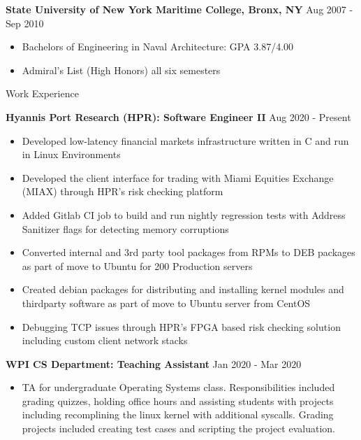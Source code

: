 \documentclass[10pt,a4paper]{article}
\begin{document}
{\begin{tcolorbox}
      \large{\textbf{State University of New York Maritime College, Bronx, NY}}
      \hfill
      \large{Aug 2007 - Sep 2010}
      \begin{itemize}[noitemsep]
        \item Bachelors of Engineering in Naval Architecture: GPA 3.87/4.00
        \item Admiral's List (High Honors) all six semesters 
      \end{itemize}
\end{tcolorbox}

\begin{tcolorbox}

  {\selectfont
    \begin{center}
      \LARGE{Work Experience}
    \end{center}
  }

  \tcblower

  \large{\textbf{Hyannis Port Research (HPR): Software Engineer II}}
  \hfill
  \large{Aug 2020 - Present}
  \begin{itemize}[noitemsep]
    \item Developed low-latency financial markets infrastructure written in C and run in Linux Environments
    \item Developed the client interface for trading with Miami Equities Exchange (MIAX) through HPR's risk checking platform
    \item Added Gitlab CI job to build and run nightly regression tests with Address Sanitizer flags for detecting memory corruptions
    \item Converted internal and 3rd party tool packages from RPMs to DEB packages as part of move to Ubuntu for 200 Production servers
    \item Created debian packages for distributing and installing kernel modules and thirdparty software as part of move to Ubuntu server from CentOS
    \item Debugging TCP issues through HPR's FPGA based risk checking solution including custom client network stacks
  \end{itemize}

  \large{\textbf{WPI CS Department: Teaching Assistant}}
  \hfill
  \large{Jan 2020 - Mar 2020}
  \begin{itemize}[noitemsep]
    \item TA for undergraduate Operating Systems class. Responsibilities included grading quizzes, holding office hours and assisting students with projects including recomplining the linux kernel with additional syscalls. Grading projects included creating test cases and scripting the project evaluation.
  \end{itemize}


\end{tcolorbox}}
\end{document}
